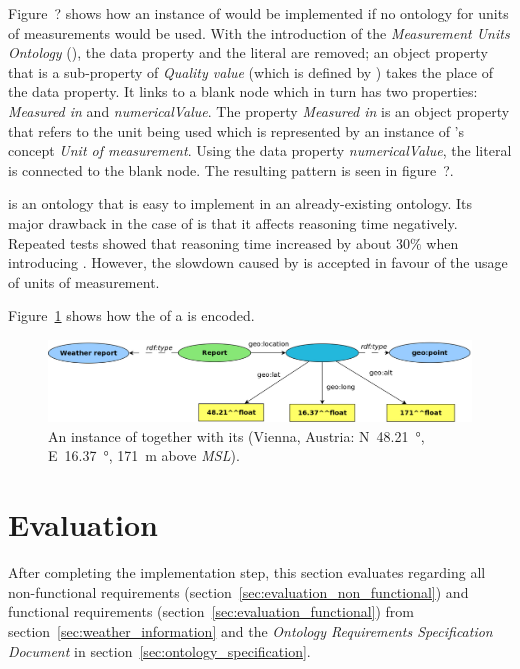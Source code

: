 \vspace{1em}

Figure~? shows how an instance of  would be implemented if no ontology for units of measurements would be used. With the introduction of the \emph{Measurement Units Ontology} (\muo), the data property and the literal are removed; an object property that is a sub-property of \emph{Quality value} (which is defined by \muo) takes the place of the data property. It links to a blank node which in turn has two properties: \emph{Measured in} and \emph{numericalValue}. The property \emph{Measured in} is an object property that refers to the unit being used which is represented by an instance of \muo's concept \emph{Unit of measurement}. Using the data property \emph{numericalValue}, the literal is connected to the blank node. The resulting pattern is seen in figure~?. %

\muo is an ontology that is easy to implement in an already-existing ontology. Its major drawback in the case of \thinkhomeweather is that it affects reasoning time negatively. Repeated tests showed that reasoning time increased by about $30 \%$ when introducing \muo. However, the slowdown caused by \muo is accepted in favour of the usage of units of measurement.

\vspace{1em}

Figure~\ref{fig:owl_wgs84} shows how the  of a  is encoded.

\begin{figure}
  \includegraphics[width=\textwidth]{figures/diagrams/wgs84.png}
  \caption{An instance of  together with its  (Vienna, Austria: N~\SI{48.21}{\degree}, E~\SI{16.37}{\degree}, \SI{171}{\metre} above \emph{MSL}).}
  \label{fig:owl_wgs84}
\end{figure}

\section{Evaluation}
\label{sec:ontology_evaluation}

After completing the implementation step, this section evaluates \thinkhomeweather regarding all non-functional requirements (section~\ref{sec:evaluation_non_functional}) and functional requirements (section~\ref{sec:evaluation_functional}) from section~\ref{sec:weather_information} and the \emph{Ontology Requirements Specification Document} in section~\ref{sec:ontology_specification}.

